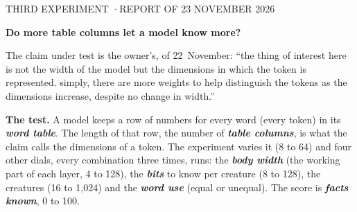 \documentclass[10pt,letterpaper]{article}
\newcommand{\smallcaps}[1]{{\sffamily\fontsize{7.6}{9}\selectfont\color{second}\addfontfeature{LetterSpace=7}#1}}
\newcommand{\term}[1]{\textbf{\textit{#1}}}      %
\newcommand{\lead}[1]{\textbf{#1}}               %
\begin{document}

\smallcaps{THIRD EXPERIMENT \enspace·\enspace REPORT OF 23 NOVEMBER 2026}\par
\vspace{4pt}
{\sffamily\bfseries\fontsize{21}{25}\selectfont Do more table columns let a model know more?\par}
\vspace{4pt}
{\sffamily\fontsize{10.5}{14}\selectfont\color{second}\raggedright The claim under test is the owner's, of
22~November: ``the thing of interest here is not the width of the model but the dimensions in which the token
is represented. simply, there are more weights to help distinguish the tokens as the dimensions increase,
despite no change in width.''\par}
\vspace{6pt}

\lead{The test.} A model keeps a row of numbers for every word (every token) in its \term{word table}. The
length of that row, the number of \term{table columns}, is what the claim calls the dimensions of a token. The
experiment varies it (8 to 64) and four other dials, every combination three times, \RunsAll{} runs: the
\term{body width} (the working part of each layer, 4 to 128), the \term{bits} to know per creature (8 to
128), the creatures (16 to 1,024) and the \term{word use} (equal or unequal). The score is \term{facts known},
0 to 100.
\end{document}
